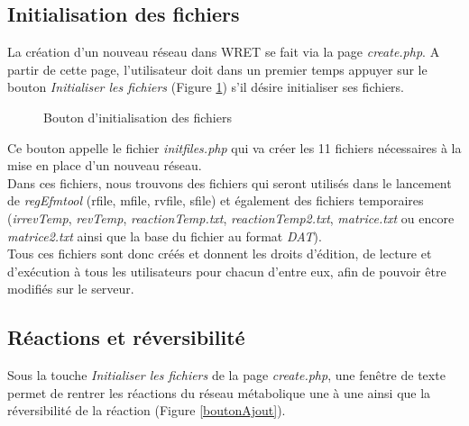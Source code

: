 \subsection{Initialisation des fichiers}
La création d'un nouveau réseau dans WRET se fait via la page \emph{create.php}.
A partir de cette page, l'utilisateur doit dans un premier temps appuyer sur le bouton \emph{Initialiser les fichiers} (Figure \ref{boutonInit}) s'il désire initialiser ses fichiers.

\begin{figure}[!ht]
    \begin{center}
        \caption{Bouton d'initialisation des fichiers}
          \label{boutonInit}
      \end{center}   
\end{figure}

Ce bouton appelle le fichier \emph{initfiles.php} qui va créer les 11 fichiers nécessaires à la mise en place d'un nouveau réseau.\\
Dans ces fichiers, nous trouvons des fichiers qui seront utilisés dans le lancement de \emph{regEfmtool} (rfile, mfile, rvfile, sfile) et également des fichiers temporaires (\emph{irrevTemp}, \emph{revTemp}, \emph{reactionTemp.txt}, \emph{reactionTemp2.txt}, \emph{matrice.txt} ou encore \emph{matrice2.txt} ainsi que la base du fichier au format \emph{DAT}).\\
Tous ces fichiers sont donc créés et donnent les droits d'édition, de lecture et d'exécution à tous les utilisateurs pour chacun d'entre eux, afin de pouvoir être modifiés sur le serveur.

\subsection{Réactions et réversibilité}
Sous la touche \emph{Initialiser les fichiers} de la page \emph{create.php}, une fenêtre de texte permet de rentrer les réactions du réseau métabolique une à une ainsi que la réversibilité de la réaction (Figure \ref{boutonAjout}).

